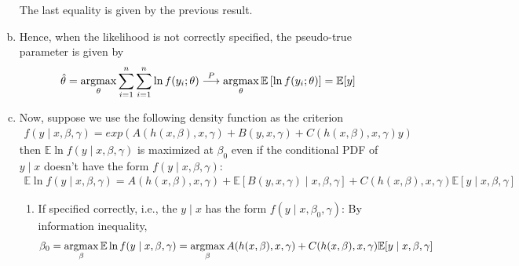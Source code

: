 \documentclass[11pt]{elegantbook}
\newcommand{\argmax}{\operatornamewithlimits{argmax}}
\begin{document}
\begin{enumerate}[(a).]
\begin{equation}
        \nonumber
    \end{equation}
    The last equality is given by the previous result.
    \item Hence, when the likelihood is not correctly specified, the pseudo-true parameter is given by
    \begin{equation}
        \begin{aligned}
            \hat{\theta}=\argmax_\theta \sum_{i=1}^n\sum_{i=1}^n\ln f(y_i;\theta) \stackrel{P}{\longrightarrow} \argmax_\theta \mathbb{E}\left[\ln f(y_i;\theta)\right]=\mathbb{E}[y]
        \end{aligned}
        \nonumber
    \end{equation}
    \item Now, suppose we use the following density function as the criterion
    \begin{equation}
        \begin{aligned}
            f(y\mid x,\beta,\gamma)=exp\left(A(h(x,\beta),x,\gamma)+B(y,x,\gamma)+C(h(x,\beta),x,\gamma)y\right)
        \end{aligned}
        \nonumber
    \end{equation}
    then $\mathbb{E}\ln f(y\mid x,\beta,\gamma)$ is maximized at $\beta_0$ even if the conditional PDF of $y\mid x$ doesn't have the form $f(y\mid x,\beta,\gamma)$:
    \begin{equation}
        \begin{aligned}
            \mathbb{E}\ln f(y\mid x,\beta,\gamma)=A(h(x,\beta),x,\gamma)+\mathbb{E}[B(y,x,\gamma)\mid x,\beta,\gamma]+C(h(x,\beta),x,\gamma)\mathbb{E}[y\mid x,\beta,\gamma]
        \end{aligned}
        \nonumber
    \end{equation}
    \begin{enumerate}
        \item If specified correctly, i.e., the $y\mid x$ has the form $f(y\mid x,\beta_0,\gamma)$: By information inequality,
        \begin{equation}
            \begin{aligned}
                \beta_0=\argmax_\beta\mathbb{E}\ln f(y\mid x,\beta,\gamma)=\argmax_\beta A(h(x,\beta),x,\gamma)+C(h(x,\beta),x,\gamma)\mathbb{E}[y\mid x,\beta,\gamma]
            \end{aligned}
            \nonumber
        \end{equation}
    \end{enumerate}
\end{enumerate}
\end{document}
